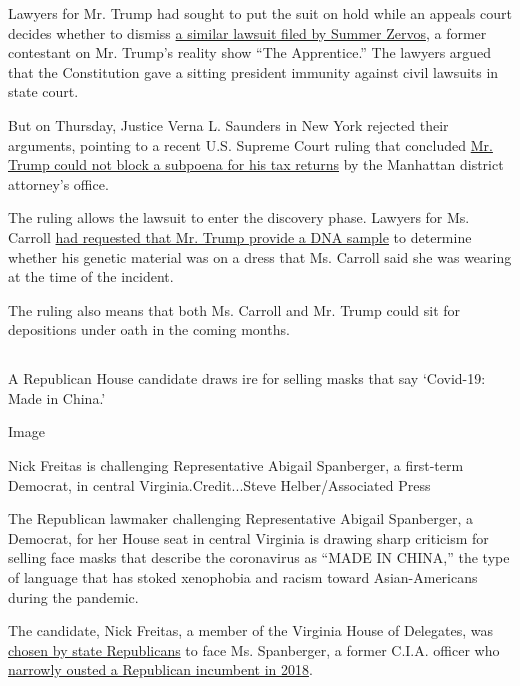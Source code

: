 Lawyers for Mr. Trump had sought to put the suit on hold while an
appeals court decides whether to dismiss
\href{https://www.nytimes3xbfgragh.onion/2017/01/17/us/former-apprentice-contestant-files-defamation-suit-against-trump.html}{a
similar lawsuit filed by Summer Zervos}, a former contestant on Mr.
Trump's reality show ``The Apprentice.'' The lawyers argued that the
Constitution gave a sitting president immunity against civil lawsuits in
state court.

But on Thursday, Justice Verna L. Saunders in New York rejected their
arguments, pointing to a recent U.S. Supreme Court ruling that concluded
\href{https://www.nytimes3xbfgragh.onion/2020/07/09/us/trump-taxes-supreme-court.html}{Mr.
Trump could not block a subpoena for his tax returns} by the Manhattan
district attorney's office.

The ruling allows the lawsuit to enter the discovery phase. Lawyers for
Ms. Carroll
\href{https://www.nytimes3xbfgragh.onion/2020/01/30/nyregion/e-jean-carroll-trump-dna.html}{had
requested that Mr. Trump provide a DNA sample} to determine whether his
genetic material was on a dress that Ms. Carroll said she was wearing at
the time of the incident.

The ruling also means that both Ms. Carroll and Mr. Trump could sit for
depositions under oath in the coming months.

\hypertarget{-11}{%
\subsection{}\label{-11}}

A Republican House candidate draws ire for selling masks that say
`Covid-19: Made in China.'

Image

Nick Freitas is challenging Representative Abigail Spanberger, a
first-term Democrat, in central Virginia.Credit...Steve
Helber/Associated Press

The Republican lawmaker challenging Representative Abigail Spanberger, a
Democrat, for her House seat in central Virginia is drawing sharp
criticism for selling face masks that describe the coronavirus as ``MADE
IN CHINA,'' the type of language that has stoked xenophobia and racism
toward Asian-Americans during the pandemic.

The candidate, Nick Freitas, a member of the Virginia House of
Delegates, was
\href{https://apnews.com/eacdfb20e3c9f7464e7dae6e98c38d9e}{chosen by
state Republicans} to face Ms. Spanberger, a former C.I.A. officer who
\href{https://www.nytimes3xbfgragh.onion/elections/results/virginia-house-district-7}{narrowly
ousted a Republican incumbent in 2018}.

